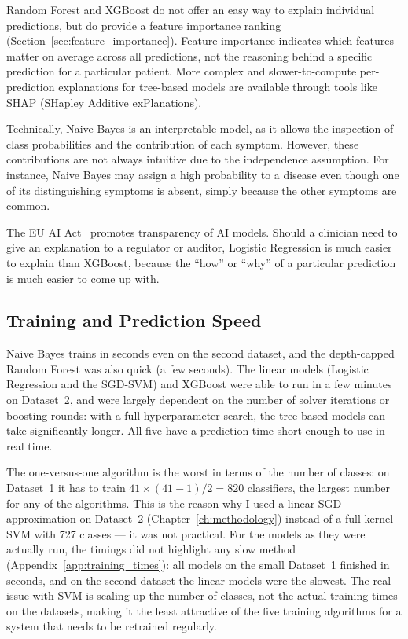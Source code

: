 Random Forest and XGBoost do not offer an easy way to explain individual predictions, but do provide a feature importance ranking (Section~\ref{sec:feature_importance}). Feature importance indicates which features matter on average across all predictions, not the reasoning behind a specific prediction for a particular patient. More complex and slower-to-compute per-prediction explanations for tree-based models are available through tools like SHAP (SHapley Additive exPlanations).

Technically, Naive Bayes is an interpretable model, as it allows the inspection of class probabilities and the contribution of each symptom. However, these contributions are not always intuitive due to the independence assumption. For instance, Naive Bayes may assign a high probability to a disease even though one of its distinguishing symptoms is absent, simply because the other symptoms are common.

The EU AI Act~\citep{EUAI2024} promotes transparency of AI models. Should a clinician need to give an explanation to a regulator or auditor, Logistic Regression is much easier to explain than XGBoost, because the ``how'' or ``why'' of a particular prediction is much easier to come up with.

\subsection{Training and Prediction Speed}

Naive Bayes trains in seconds even on the second dataset, and the depth-capped Random Forest was also quick (a few seconds). The linear models (Logistic Regression and the SGD-SVM) and XGBoost were able to run in a few minutes on Dataset~2, and were largely dependent on the number of solver iterations or boosting rounds: with a full hyperparameter search, the tree-based models can take significantly longer. All five have a prediction time short enough to use in real time.

The one-versus-one algorithm is the worst in terms of the number of classes: on Dataset~1 it has to train $41 \times (41-1)/2 = 820$ classifiers, the largest number for any of the algorithms. This is the reason why I used a linear SGD approximation on Dataset~2 (Chapter~\ref{ch:methodology}) instead of a full kernel SVM with 727 classes --- it was not practical. For the models as they were actually run, the timings did not highlight any slow method (Appendix~\ref{app:training_times}): all models on the small Dataset~1 finished in seconds, and on the second dataset the linear models were the slowest. The real issue with SVM is scaling up the number of classes, not the actual training times on the datasets, making it the least attractive of the five training algorithms for a system that needs to be retrained regularly.


